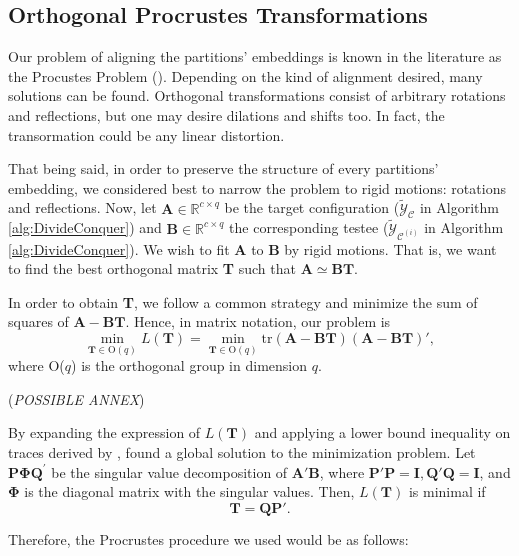 \subsection{Orthogonal Procrustes Transformations}

Our problem of aligning the partitions' embeddings is known in the literature as the Procustes Problem (\cite{Borg2005}). Depending on the kind of alignment desired, many solutions can be found. Orthogonal transformations consist of arbitrary rotations and reflections, but one may desire dilations and shifts too. In fact, the transormation could be any linear distortion.

That being said, in order to preserve the structure of every partitions' embedding, we considered best to narrow the problem to rigid motions: rotations and reflections. Now, let $\mathbf{A} \in \mathbb{R}^{c \times q}$ be the target configuration ($\tilde{\mathcal{Y}}_{\mathcal{C}}$ in Algorithm \ref{alg:DivideConquer}) and $\mathbf{B} \in \mathbb{R}^{c \times q}$ the corresponding testee ($\tilde{\mathcal{Y}}_{\mathcal{C}^{(i)}}$ in Algorithm \ref{alg:DivideConquer}). We wish to fit \textbf{A} to \textbf{B} by rigid motions. That is, we want to find the best orthogonal matrix \textbf{T} such that $\mathbf{A} \simeq \mathbf{BT}$.

In order to obtain \textbf{T}, we follow a common strategy and minimize the sum of squares of $\mathbf{A} - \mathbf{BT}$. Hence, in matrix notation, our problem is
$$
\min_{\mathbf{T} \in \text{O}(q)} L(\mathbf{T}) = \min_{\mathbf{T} \in \text{O}(q)} \text{tr}(\mathbf{A}-\mathbf{BT})(\mathbf{A}-\mathbf{BT})',
$$
where O($q$) is the orthogonal group in dimension $q$.

(\textit{POSSIBLE ANNEX})

By expanding the expression of $L(\mathbf{T})$ and applying a lower bound inequality on traces derived by \cite{Kristof1970}, \cite{Borg2005} found a global solution to the minimization problem. Let $\mathbf{P} \boldsymbol{\Phi} \mathbf{Q}^{\prime}$ be the singular value decomposition of $\mathbf{A}' \mathbf{B}$, where $\mathbf{P}' \mathbf{P}=\mathbf{I}, \mathbf{Q}' \mathbf{Q}=\mathbf{I}$, and $\boldsymbol{\Phi}$ is the diagonal matrix with the singular values. Then, $L(\mathbf{T})$ is minimal if
$$
\mathbf{T} = \mathbf{QP}'.
$$

Therefore, the Procrustes procedure we used would be as follows:

